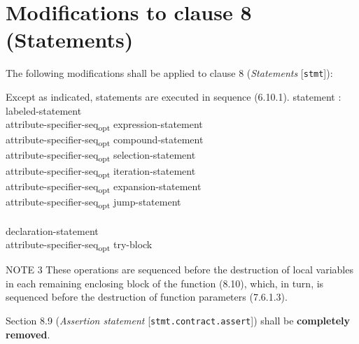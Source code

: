 \section{Modifications to clause 8 (Statements)}

The following modifications shall be applied to clause 8 (\emph{Statements}
[\texttt{stmt}]):

\begin{modification}
Except as indicated, statements are executed in sequence (6.10.1).
\newline
statement :\\
\tabto{1em}labeled-statement\\
\tabto{1em}attribute-specifier-seq\textsubscript{opt} expression-statement\\
\tabto{1em}attribute-specifier-seq\textsubscript{opt} compound-statement\\
\tabto{1em}attribute-specifier-seq\textsubscript{opt} selection-statement\\
\tabto{1em}attribute-specifier-seq\textsubscript{opt} iteration-statement\\
\tabto{1em}attribute-specifier-seq\textsubscript{opt} expansion-statement\\
\tabto{1em}attribute-specifier-seq\textsubscript{opt} jump-statement\\
\tabto{1em}\\
\tabto{1em}declaration-statement\\
\tabto{1em}attribute-specifier-seq\textsubscript{opt} try-block\\

\end{modification}

\begin{modification}
NOTE 3 These operations are sequenced before the destruction of local variables in each remaining enclosing block of
the function (8.10), 
which, in turn, is sequenced before the destruction of function parameters (7.6.1.3).
\end{modification}

\begin{removal}
Section 8.9 (\emph{Assertion statement} [\texttt{stmt.contract.assert}]) shall
be \textbf{completely removed}.
\end{removal}



